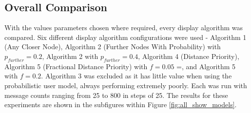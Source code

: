 \documentclass[bsc,frontabs,twoside,singlespacing,parskip,deptreport]{infthesis}     %
\begin{document}
\subsection{Overall Comparison} \label{subsec:all_show_models_results}
With the values parameters chosen where required, every display algorithm was compared. Six different display algorithm configurations were used - Algorithm 1 (Any Closer Node), Algorithm 2 (Further Nodes With Probability) with $p_{further}=0.2$, Algorithm 2 with $p_{further}=0.4$, Algorithm 4 (Distance Priority), Algorithm 5 (Fractional Distance Priority) with $f=0.05$ =, and Algorithm 5 with $f=0.2$. Algorithm 3 was excluded as it has little value when using the probabilistic user model, always performing extremely poorly. Each was run with message counts ranging from 25 to 800 in steps of 25. The results for these experiments are shown in the subfigures within Figure \ref{fig:all_show_models}.
\end{document}
